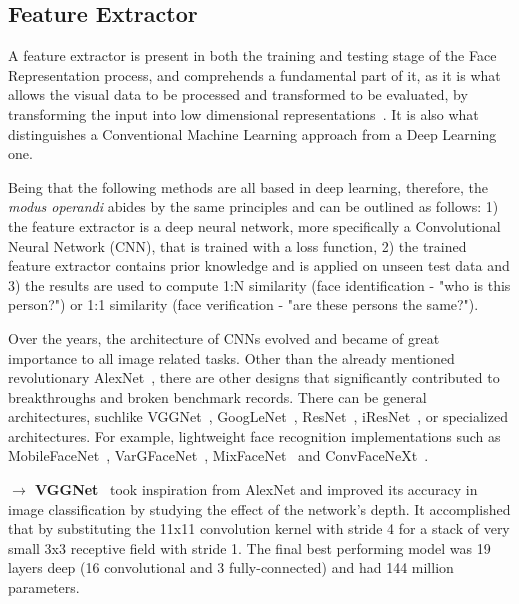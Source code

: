 \documentclass[class=report, crop=false, a4paper, 12pt]{standalone}
\begin{document}
\subsection{Feature Extractor}
A feature extractor is present in both the training and testing stage of the Face Representation process, and comprehends a fundamental part of it, as it is what allows the visual data to be processed and transformed to be evaluated, by transforming the input into low dimensional representations~\autocite{lecunGradientBasedLearningApplied1998}. It is also what distinguishes a Conventional Machine Learning approach from a Deep Learning one.  
\par Being that the following methods are all based in deep learning, therefore, the \textit{modus operandi} abides by the same principles and can be outlined as follows: 1) the feature extractor is a deep neural network, more specifically a Convolutional Neural Network (CNN), that is trained with a loss function, 2) the trained feature extractor contains prior knowledge and is applied on unseen test data and 3) the results are used to compute 1:N similarity (face identification - "who is this person?") or 1:1 similarity (face verification - "are these persons the same?").
\par Over the years, the architecture of CNNs evolved and became of great importance to all image related tasks. Other than the already mentioned revolutionary AlexNet~\autocite{krizhevskyImageNetClassificationDeep2012}, there are other designs that significantly contributed to breakthroughs and broken benchmark records. There can be general architectures, suchlike VGGNet~\autocite{simonyanVERYDEEPCONVOLUTIONAL2015}, GoogLeNet~\autocite{szegedyGoingDeeperConvolutions2014}, ResNet~\autocite{heDeepResidualLearning2016}, iResNet~\autocite{dutaImprovedResidualNetworks2021}, or specialized architectures. For example, lightweight face recognition implementations such as MobileFaceNet~\autocite{chenMobileFaceNetsEfficientCNNs2018}, VarGFaceNet~\autocite{yanVarGFaceNetEfficientVariable2019}, MixFaceNet~\autocite{boutrosMixFaceNetsExtremelyEfficient2021} and ConvFaceNeXt~\autocite{hooConvFaceNeXtLightweightNetworks2022}.

\newpage
\noindent\textbf{$\rightarrow$ VGGNet}~\autocite{simonyanVERYDEEPCONVOLUTIONAL2015} took inspiration from AlexNet and improved its accuracy in image classification by studying the effect of the network's depth. It accomplished that by substituting the 11x11 convolution kernel with stride 4 for a stack of very small 3x3 receptive field with stride 1. The final best performing model was 19 layers deep (16 convolutional and 3 fully-connected) and had 144 million parameters.
\end{document}
